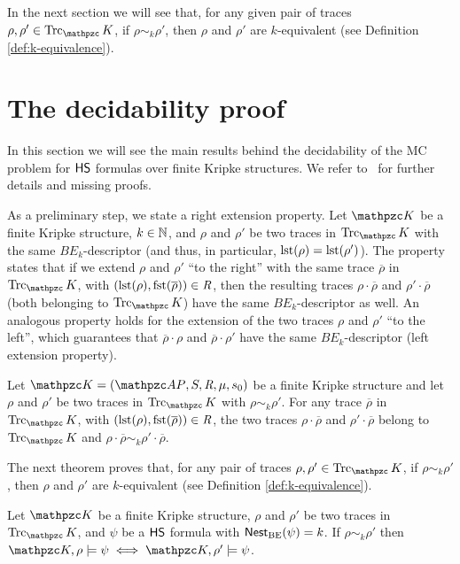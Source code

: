 In the next section we will see that, for any given pair of traces $\rho,\rho'\in\Trk_\Ku$, 
if $\rho\sim_k\rho'$, then $\rho$ and $\rho'$ are $k$-equivalent (see Definition \ref{def:k-equivalence}).

\section{The decidability proof}\label{sec:decidProof}

In this section we 
will see the main results behind the decidability of the MC problem for $\text{\sffamily HS}$ formulas over finite Kripke structures.
We refer to~\cite{MMMPP15} for further details and missing proofs.

As a preliminary step, we state a right extension property. Let $\Ku$ be a finite Kripke structure, $k\in\mathbb{N}$, and $\rho$ and $\rho'$ be two traces in $\Trk_\Ku$ with the same $BE_k$-descriptor (and thus, in particular, $\operatorname{lst}(\rho)=\operatorname{lst}(\rho')$). The property states that if we extend $\rho$ and $\rho'$ ``to the right'' with the same trace $\overline{\rho}$ in $\Trk_\Ku$, with $\left(\operatorname{lst}(\rho),\operatorname{fst}(\overline{\rho})\right)\in\textit{R}$, then the resulting traces $\rho\cdot \overline{\rho}$ and $\rho'\cdot\overline{\rho}$ (both belonging to $\Trk_\Ku$) have the same $BE_k$-descriptor as well. 
An analogous property holds for the extension of the two traces $\rho$ and $\rho'$ ``to the left'', which guarantees that $\overline{\rho}\cdot \rho$ and $\overline{\rho}\cdot \rho'$ have the same $BE_k$-descriptor (left extension property).

\begin{proposition}\label{extLemma}
Let $\Ku=\KuDef$ be a finite Kripke structure and let $\rho$ and $\rho'$ be two traces in $\Trk_\Ku$ with $\rho\sim_k\rho'$. For any trace $\overline{\rho}$ in $\Trk_\Ku$, with $\left(\operatorname{lst}(\rho),\operatorname{fst}(\overline{\rho})\right)\in\textit{R}$, the two traces $\rho\cdot \overline{\rho}$ and $\rho'\cdot\overline{\rho}$ belong to $\Trk_\Ku$ and $\rho\cdot\overline{\rho}\sim_k\rho'\cdot\overline{\rho}$.
\end{proposition}

The next theorem proves that, for any pair of traces $\rho,\rho'\in\Trk_\Ku$, if $\rho\sim_k\rho'$, then $\rho$ and $\rho'$ are $k$-equivalent (see Definition \ref{def:k-equivalence}). 
\begin{theorem}\label{satPresB}
Let $\Ku$ be a finite Kripke structure, $\rho$ and $\rho'$ be two traces in $\Trk_\Ku$, and $\psi$ be a $\text{\sffamily HS}$ formula with $\operatorname{\mathsf{Nest}_{BE}}(\psi)=k$. If $\rho\sim_k\rho'$ then 
$\Ku,\rho\models\psi\iff \Ku,\rho'\models\psi$.
\end{theorem}

